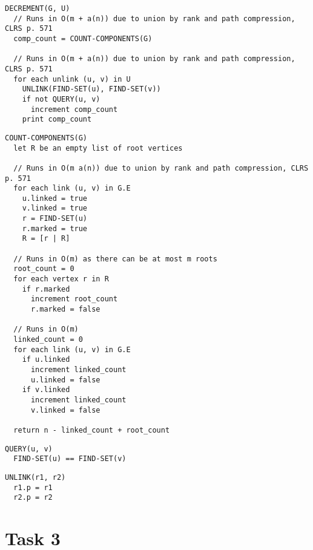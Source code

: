 \documentclass[paper=a4, fleqn]{article}
\begin{document}
\begin{lstlisting}
DECREMENT(G, U)
  // Runs in O(m + a(n)) due to union by rank and path compression, CLRS p. 571
  comp_count = COUNT-COMPONENTS(G)

  // Runs in O(m + a(n)) due to union by rank and path compression, CLRS p. 571
  for each unlink (u, v) in U
    UNLINK(FIND-SET(u), FIND-SET(v))
    if not QUERY(u, v)
      increment comp_count
    print comp_count
\end{lstlisting}

\begin{lstlisting}
COUNT-COMPONENTS(G)
  let R be an empty list of root vertices

  // Runs in O(m a(n)) due to union by rank and path compression, CLRS p. 571
  for each link (u, v) in G.E
    u.linked = true
    v.linked = true
    r = FIND-SET(u)
    r.marked = true
    R = [r | R]

  // Runs in O(m) as there can be at most m roots
  root_count = 0
  for each vertex r in R
    if r.marked
      increment root_count
      r.marked = false

  // Runs in O(m)
  linked_count = 0
  for each link (u, v) in G.E
    if u.linked
      increment linked_count
      u.linked = false
    if v.linked
      increment linked_count
      v.linked = false

  return n - linked_count + root_count
\end{lstlisting}

\begin{lstlisting}
QUERY(u, v)
  FIND-SET(u) == FIND-SET(v)
\end{lstlisting}

\begin{lstlisting}
UNLINK(r1, r2)
  r1.p = r1
  r2.p = r2
\end{lstlisting}

\section*{Task 3}
\end{document}
